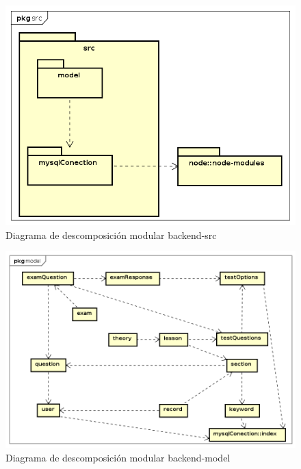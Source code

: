 \documentclass[openright,twoside,10pt]{book}
\begin{document}
    \vspace*{\fill} \newpage
    \vspace*{\fill}
    
    \begin{figure}[H]
        \begin{center}
            \includegraphics[width=\textwidth]{img/astah/disenio/descomposicion/back/src.png}
        \end{center}
        \caption{Diagrama de descomposición modular backend-src}
    \end{figure}
    
    \vspace*{\fill} \newpage
    \vspace*{\fill}
    
    \begin{figure}[H]
        \begin{center}
            \includegraphics[width=\textwidth]{img/astah/disenio/descomposicion/back/model.png}
        \end{center}
        \caption{Diagrama de descomposición modular backend-model}
    \end{figure}
    
\end{document}
